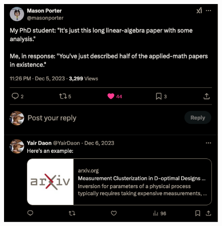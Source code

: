 \documentclass{beamer}
\begin{document}
\begin{frame}
  \begin{figure}
    \centering
    \includegraphics[width=\textwidth]{figs/la.png}
  \end{figure}
\end{frame}
\end{document}
